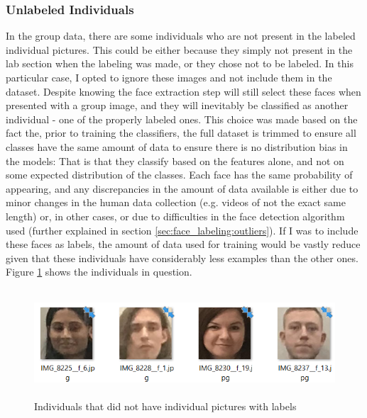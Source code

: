 \documentclass[11pt]{article}
\begin{document}
        \subsubsection{Unlabeled Individuals}
            In the group data, there are some individuals who are not present in the labeled individual pictures. This could be either because they simply not present in the lab section when the labeling was made, or they chose not to be labeled. In this particular case, I opted to ignore these images and not include them in the dataset. Despite knowing the face extraction step will still select these faces when presented with a group image, and they will inevitably be classified as another individual - one of the properly labeled ones. This choice was made based on the fact the, prior to training the classifiers, the full dataset is trimmed to ensure all classes have the same amount of data to ensure there is no distribution bias in the models: That is that they classify based on the features alone, and not on some expected distribution of the classes. Each face has the same probability of appearing, and any discrepancies in the amount of data available is either due to minor changes in the human data collection (e.g. videos of not the exact same length) or, in other cases, or due to difficulties in the face detection algorithm used (further explained in section \ref{sec:face_labeling:outliers}). If I was to include these faces as labels, the amount of data used for training would be vastly reduce given that these individuals have considerably less examples than the other ones. Figure \ref{fig:label:unlabeled_inds} shows the individuals in question.
            \begin{figure}[ht]
                \centering
                \includegraphics[height=4cm]{./Images/labeling/unlabeled_inds.png}
                \caption{Individuals that did not have individual pictures with labels}
                \label{fig:label:unlabeled_inds}
            \end{figure}
\end{document}
